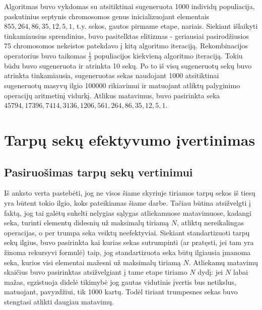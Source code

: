 \documentclass{VUMIFInfKursinis}
\begin{document}
Algoritmas buvo vykdomas su atsitiktinai sugeneruota 1000 individų populiacija,
paskutinius septynis chromosomos genus inicializuojant elementais $855, 264, 86, 35, 12, 5, 1$, t.y. sekos, gautos pirmame etape, nariais.
Siekiant išlaikyti tinkamiausius sprendinius, buvo pasitelktas elitizmas - geriausiai pasirodžiusios 75 chromosomos nekeistos
patekdavo į kitą algoritmo iteraciją.
Rekombinacijos operatorius buvo taikomas $\frac{1}{2}$ populiacijos kiekvieną algoritmo iteraciją.
Tokiu būdu buvo sugeneruota ir atrinkta 10 sekų.
Po to iš visų sugeneruotų sekų buvo atrinkta tinkamiausia, sugeneruotas sekas naudojant 1000 atsitiktinai sugeneruotų masyvų ilgio 100000 rikiavimui
ir matuojant atliktų palyginimo operacijų aritmetinį vidurkį.
Atlikus matavimus, buvo pasirinkta seka $45794, 17396, 7414, 3136, 1206, 561, 264, 86, 35, 12, 5, 1$.

\section{Tarpų sekų efektyvumo įvertinimas}

\subsection{Pasiruošimas tarpų sekų vertinimui}

Iš anksto verta pastebėti, jog ne visos šiame skyriuje tiriamos tarpų sekos iš tiesų yra būtent tokio ilgio, koks pateikiamas šiame darbe.
Tačiau būtina atsižvelgti į faktą, jog tai galėtų sukelti nelygias sąlygas atliekamuose matavimuose,
kadangi seka, turinti elementų didesnių už maksimalų tiriamą $N$, atliktų nereikalingas operacijas, o per trumpa seka veiktų neefektyviai.
Siekiant standartizuoti tarpų sekų ilgius, buvo pasirinkta kai kurias sekas sutrumpinti (ar pratęsti, jei tam yra žinoma rekursyvi formulė)
taip, jog standartizuota seka būtų ilgiausia įmanoma seka, kurios visi elementai mažesni už maksimalų tiriamą $N$.
Atliekamų matavimų skaičius buvo pasirinktas atsižvelgiant į tame etape tiriamo $N$ dydį: jei $N$ labai mažas,
egzistuoja didelė tikimybė jog gautas vidutinis įvertis bus netikslus, matuojant, pavyzdžiui, tik 1000 kartų.
Todėl tiriant trumpesnes sekas buvo stengtasi atlikti daugiau matavimų.
\end{document}
